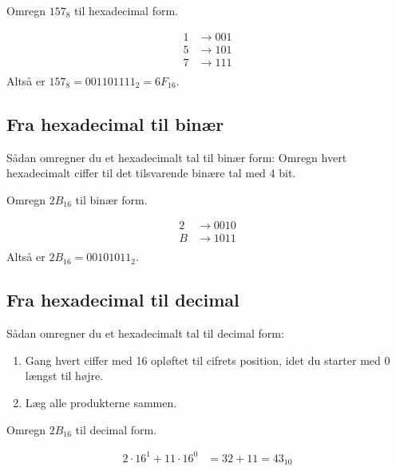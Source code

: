 \begin{example}Omregn \(157_8\) til hexadecimal form.

\begin{solution}

\[
\begin{aligned}
1 & \rightarrow 001 \\
5 & \rightarrow 101 \\
7 & \rightarrow 111 \\
\end{aligned}
\]
Altså er \(157_8 = 001101111_2 = 6F_{16}\). \end{solution}
\end{example}

\subsection*{Fra hexadecimal til binær}
Sådan omregner du et hexadecimalt tal til binær form: Omregn hvert hexadecimalt ciffer til det tilsvarende binære tal med 4 bit.

\begin{example}Omregn \(2B_{16}\) til binær form.

\begin{solution}
    


\[
\begin{aligned}
2 & \rightarrow 0010 \\
B & \rightarrow 1011 \\
\end{aligned}
\]
Altså er \(2B_{16} = 00101011_2\).\end{solution}

\end{example}

\subsection*{Fra hexadecimal til decimal}
Sådan omregner du et hexadecimalt tal til decimal form:
\begin{enumerate}
    \item Gang hvert ciffer med 16 opløftet til cifrets position, idet du starter med 0 længst til højre.
    \item Læg alle produkterne sammen.
\end{enumerate}

\begin{example}Omregn \(2B_{16}\) til decimal form.

\begin{solution}
\[
\begin{aligned}
2 \cdot 16^1 + 11 \cdot 16^0 & = 32 + 11 = 43_{10}
\end{aligned}
\] \end{solution}
\end{example}

